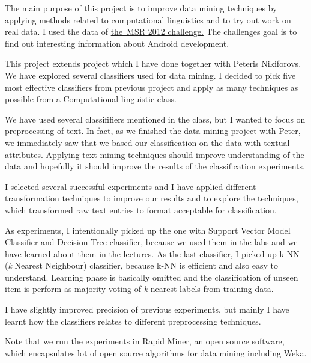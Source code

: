
The main purpose of this project is to improve data mining techniques by applying
methods related to computational linguistics and to try out work on real data.
I used the data of 
\href{http://2012.msrconf.org/challenge.php}{the~MSR 2012 challenge.} The challenges goal is to find out interesting information about Android development.

This project extends project which I have done together with Peteris Nikiforovs. 
We have explored several classifiers used for data mining.
I decided to pick five most effective classifiers from previous project and apply 
as many techniques as possible from a Computational linguistic class. 

We have used several classififiers mentioned in the class, but I wanted to focus on preprocessing of text. In fact, as we finished the data mining project with Peter, we immediately saw that we based our classification on the data with textual attributes. Applying text mining techniques should improve understanding of the data and hopefully it should improve the results of the classification experiments.

I selected several successful experiments and I have applied different transformation techniques to improve our results
and to explore the techniques, which transformed raw text entries to format acceptable for classification.

As experiments, I intentionally picked up the one with Support Vector Model Classifier and Decision Tree classifier,
because we used them in the labs and we have learned about them in the lectures. As the last classifier, I picked up
 k-NN ({\it k} Nearest Neighbour) classifier, because k-NN is efficient and also easy to understand.
Learning phase is basically omitted and the classification of unseen item is perform as majority voting
of {\it k} nearest labels from training data.

I have slightly improved precision of previous experiments, but mainly
I have learnt how the classifiers relates to different preprocessing techniques. 

Note that we run the experiments in Rapid Miner, an open source software, which encapsulates 
lot of open source algorithms for data mining including Weka. 
